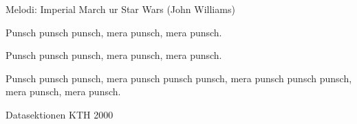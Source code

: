 \begin{song}

\begin{songmeta}
Melodi: Imperial March ur Star Wars (John Williams)
\end{songmeta}

\begin{songtext}
Punsch punsch punsch,
mera punsch,
mera punsch.

Punsch punsch punsch,
mera punsch,
mera punsch.

Punsch punsch punsch,
mera punsch punsch punsch,
mera punsch punsch punsch,
mera punsch,
mera punsch.
\end{songtext}

\begin{songnotes}
Datasektionen KTH 2000
\end{songnotes}

\end{song}
